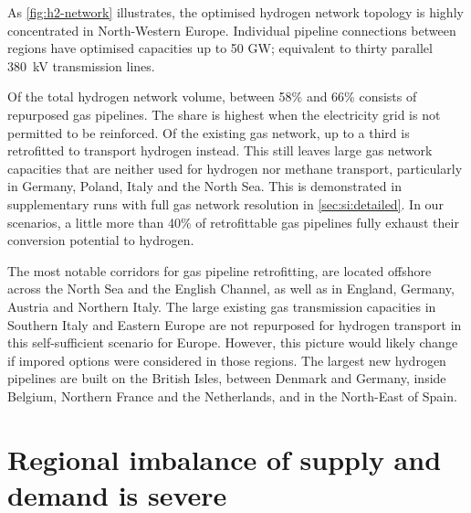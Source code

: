 
As \cref{fig:h2-network} illustrates, the optimised hydrogen network topology is
highly concentrated in North-Western Europe. Individual pipeline connections
between regions have optimised capacities up to 50 GW; equivalent to thirty
parallel 380~kV transmission lines.

Of the total hydrogen network volume, between 58\% and 66\% consists of
repurposed gas pipelines. The share is highest when the electricity grid is not
permitted to be reinforced. Of the existing gas network, up to a third is
retrofitted to %
transport hydrogen instead. This still leaves large gas network capacities that
are neither used for hydrogen nor methane transport, particularly in Germany,
Poland, Italy and the North Sea. This is demonstrated in supplementary runs with
full gas network resolution in \cref{sec:si:detailed}. In our scenarios, a
little more than 40\% of retrofittable gas pipelines fully exhaust their
conversion potential to hydrogen.

The most notable corridors for gas pipeline retrofitting, are located offshore
across the North Sea and the English Channel, as well as in England, Germany,
Austria and Northern Italy. The large existing gas transmission capacities in
Southern Italy and Eastern Europe are not repurposed for hydrogen transport in
this self-sufficient scenario for Europe. However, this picture would likely
change if impored options were considered in those regions. The largest new
hydrogen pipelines are built on the British Isles, between Denmark and Germany,
inside Belgium, Northern France and the Netherlands, and in the North-East of
Spain.


\section*{Regional imbalance of supply and demand is severe}
\label{sec:imbalance}

